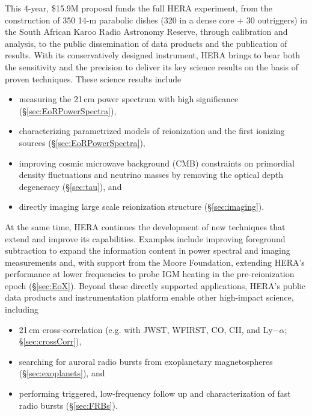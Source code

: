 \documentclass[preprint,11pt]{aastex}
\begin{document}
This 4-year, \$15.9M proposal funds the full HERA experiment, from the construction of
350 14-m parabolic dishes (320 in a dense core $+$ 30 outriggers) in the South African Karoo Radio
Astronomy Reserve, through calibration and analysis, to the public
dissemination of data products and the publication of results.
With its conservatively designed instrument, HERA brings to bear both the sensitivity and the precision to deliver 
its key science results on the basis of proven techniques.
These science results include
\begin{itemize}[noitemsep,nolistsep]
\item measuring the 21\,cm power spectrum with high significance (\S\ref{sec:EoRPowerSpectra}),
\item characterizing parametrized models of reionization and the first ionizing sources (\S\ref{sec:EoRPowerSpectra}),
\item improving cosmic microwave background (CMB) constraints on primordial density fluctuations and neutrino masses by removing the optical depth degeneracy (\S\ref{sec:tau}), and
\item directly imaging large scale reionization structure (\S\ref{sec:imaging}).
\end{itemize}
At the same time, HERA continues the development of new techniques that extend and improve its capabilities.
Examples include improving foreground subtraction to expand the information content 
in power spectral and imaging measurements and, with support from the Moore Foundation,
extending HERA's performance at lower frequencies to probe IGM heating in the pre-reionization epoch (\S\ref{sec:EoX}).
Beyond these directly supported applications, HERA's public data products and instrumentation platform enable other high-impact science, including 
\begin{itemize}[noitemsep,nolistsep]
\item 21\,cm cross-correlation (e.g. with JWST, WFIRST, CO, CII, and Ly$-\alpha$; \S\ref{sec:crossCorr}),
\item searching for auroral radio bursts from exoplanetary magnetospheres (\S\ref{sec:exoplanets}), and
\item performing triggered, low-frequency follow up and characterization of fast radio bursts (\S\ref{sec:FRBs}).
\end{itemize}
\end{document}
